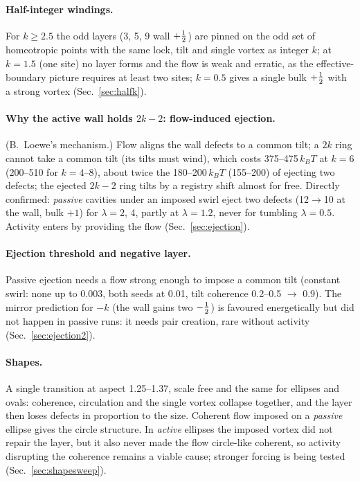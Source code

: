 \paragraph{Half-integer windings.} For $k\ge2.5$ the odd layers (3, 5, 9 wall $+\tfrac12$) are pinned on the odd set of homeotropic points with the same lock,
tilt and single vortex as integer $k$; at $k=1.5$ (one site) no layer forms and the flow is weak and erratic, as the effective-boundary picture requires at least two sites;
$k=0.5$ gives a single bulk $+\tfrac12$ with a strong vortex (Sec.~\ref{sec:halfk}).

\paragraph{Why the active wall holds $2k-2$: flow-induced ejection.} (B.~Loewe's mechanism.) Flow aligns the wall defects to a common tilt; a $2k$ ring cannot take a
common tilt (its tilts must wind), which costs 375--475\,$k_BT$ at $k=6$ (200--510 for $k=4$--8), about twice the 180--200\,$k_BT$ (155--200) of ejecting two defects; the ejected $2k-2$ ring tilts by a registry shift
almost for free. Directly confirmed: \emph{passive} cavities under an imposed swirl eject two defects (12$\to$10 at the wall, bulk $+1$) for $\lambda=2$, 4, partly at
$\lambda=1.2$, never for tumbling $\lambda=0.5$. Activity enters by providing the flow (Sec.~\ref{sec:ejection}).

\paragraph{Ejection threshold and negative layer.} Passive ejection needs a flow strong enough to impose a common tilt (constant swirl: none up to 0.003, both
seeds at 0.01, tilt coherence 0.2--0.5 $\to$ 0.9). The mirror prediction for $-k$ (the wall gains two $-\tfrac12$) is favoured energetically but did not happen in passive runs:
it needs pair creation, rare without activity (Sec.~\ref{sec:ejection2}).

\paragraph{Shapes.} A single transition at aspect 1.25--1.37, scale free and the same for ellipses and ovals: coherence, circulation and the single vortex collapse together,
and the layer then loses defects in proportion to the size. Coherent flow imposed on a \emph{passive} ellipse gives the circle structure. In \emph{active} ellipses the imposed vortex
did not repair the layer, but it also never made the flow circle-like coherent, so activity disrupting the coherence remains a viable cause; stronger forcing is being tested
(Sec.~\ref{sec:shapesweep}).

